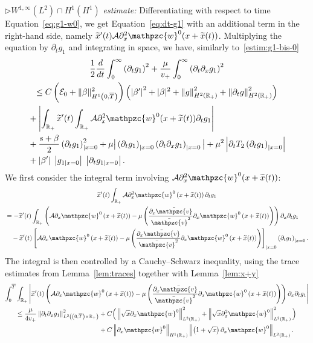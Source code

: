 \documentclass[AHL,Unicode,longabstracts,published]{cedram}
\newcommand{\R}{\mathbb{R}}
\newcommand{\p}{\partial}
\newcommand{\bv}{\bar{\mathpzc{v}}}
\newcommand{\cA}{\mathcal A}
\newcommand{\cE}{\mathcal E}
\newcommand{\tw}{\mathpzc{w}}
\newcommand{\tx}{\widetilde{x}}
\newcommand{\tx}{\widetilde{x}}
\begin{document}
$\rhd W^{1,\infty}(L^2)\cap H^1(H^1)$ \emph{estimate:} Differentiating with respect to time Equation~\eqref{eq:g1-w0}, we get Equation~\eqref{eq:dt-g1} with an additional term in the right-hand side, namely $\tx'(t)\cA \partial^2_x \tw^0(x+\tx(t))$. Multiplying the equation by $\partial_t g_1$ and integrating in space, we have, similarly to~\eqref{estim:g1-bis-0}
\begin{multline}\label{estim:dt-g1-bis-0}
 \frac{1}{2}\frac{d}{dt}\int_0^\infty \left(\p_t g_1\right)^2 + \frac{\mu}{v_+}\int_0^\infty \left(\p_t \p_x g_1\right)^2  \\
 \leq C\left(\cE_0 + \|\beta\|_{H^1\left(0, \overline{T}\right)}^2\right)\left(\left|\beta'\right|^2 + |\beta|^2+ \left\| g \right\|_{H^2(\R_+)}^2 + \left\| \p_t g\right\|_{H^2(\R_+)}^2\right)
\\
\begin{aligned}
&  + \left|\int_{\R_+} \tx'(t)\int_{\R_+}\cA \partial^2_x \tw^0(x+\tx(t)) \partial_t g_1 \right|\\
& + \dfrac{s+ \beta}{2} \left(\p_t g_1\right)_{|x=0}^2 + \mu \big|\left(\p_t g_1\right)_{|x=0}\left(\p_t \partial_x g_1\right)_{|x=0} \big| +\mu^2 \left|\p_t T_2 \left(\p_t g_1\right)_{|x=0} \right|
\\
&+ \left|\beta'\right| \; \left|g_{1|x=0}\right| \; \left|\p_t g_{1|x=0}\right|.
\end{aligned}
\end{multline}
We first consider the integral term involving $\cA \partial^2_x \tw^0(x+\tx(t))$:
\begin{multline*}
\tx'(t)\int_{\R_+}\cA \partial^2_x \tw^0\left(x+\tx(t)\right) \partial_t g_1 \\
\begin{aligned}
& = - \tx'(t) \int_{\R_+} \left(\cA \partial_x \tw^0\left(x+ \tx(t)\right) - \mu \left(\frac{\partial_x \bv}{\bv^2}\partial_x \tw^0\left(x+\tx(t)\right)\right) \right) \partial_x \partial_t g_1 \\
& \quad -\tx'(t) \left[\cA \partial_x \tw^0\left(x+ \tx(t)\right) - \mu \left(\frac{\partial_x \bv}{\bv^2}\partial_x \tw^0\left(x+\tx(t)\right)\right)\right]_{|x=0}\left(\partial_t g_1\right)_{|x=0}.
\end{aligned}
\end{multline*}
The integral is then controlled by a Cauchy--Schwarz inequality, using the trace estimates from Lemma~\ref{lem:traces} together with Lemma~\ref{lem:x+y}
\begin{multline*}
\int_0^{\overline{T}}\int_{\R_+} \left|\tx'(t) \left(\cA \partial_x \tw^0\left(x+ \tx(t)\right) - \mu \left(\frac{\partial_x \bv}{\bv^2}\partial_x \tw^0\left(x+\tx(t)\right)\right) \right) \partial_x \partial_t g_1 \right| \\
\begin{aligned}
\leq \frac{\mu}{4v_+} \left\|\partial_t \partial_x g_1\right\|_{L^2\left(\left(0,\overline{T}\right)\times \R_+\right)}^2 &+ C \Big(\left\|\sqrt{x} \partial_x \tw^0\right\|_{L^2(\R_+)}^2 + \left\|\sqrt{x} \partial^2_x \tw^0\right\|_{L^2(\R_+)}^2 \Big)\\
 &+ C\left\|\p_x \tw^0\right\|_{H^1(\R_+)} \left\|\left(1+\sqrt{x}\right)\p_x \tw^0\right\|_{L^2(\R_+)}.
\end{aligned}
\end{multline*}
\end{document}
